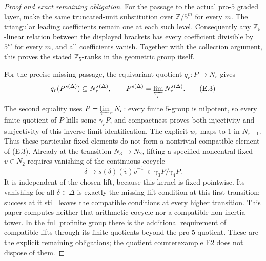 \begin{proof}[Proof and exact remaining obligation]
For the passage to the actual pro-$5$ graded layer, make the same
truncated-unit substitution over $\mathbb Z/5^m$ for every $m$.
The triangular leading coefficients remain one at each such level.
Consequently any $\mathbb Z_5$-linear relation between the displayed
brackets has every coefficient divisible by $5^m$ for every $m$, and
all coefficients vanish. Together with the collection argument, this
proves the stated $\mathbb Z_5$-ranks in the geometric group itself.

For the precise missing passage, the equivariant quotient $q_r:P\to N_r$ gives
\[
 q_r(P^{s(\Delta)})\subseteq N_r^{s(\Delta)},\qquad
 P^{s(\Delta)}=\varprojlim_r N_r^{s(\Delta)}.
 \tag{E.3}
\]
The second equality uses $P=\varprojlim_rN_r$: every finite $5$-group is nilpotent, so every finite quotient of $P$ kills some $\gamma_rP$, and compactness proves both injectivity and surjectivity of this inverse-limit identification. The explicit $w_r$ maps to $1$ in $N_{r-1}$. Thus these particular fixed elements do not form a nontrivial compatible element of (E.3). Already at the transition $N_3\to N_2$, lifting a specified noncentral fixed $v\in N_2$ requires vanishing of the continuous cocycle
\[
 \delta\longmapsto s(\delta)(\widetilde v)\widetilde v^{-1}
 \ \in\gamma_3P/\gamma_4P.
\]
It is independent of the chosen lift, because this kernel is fixed pointwise. Its vanishing for all $\delta\in\Delta$ is exactly the missing lift condition at this first transition; success at it still leaves the compatible conditions at every higher transition. This paper computes neither that arithmetic cocycle nor a compatible non-inertia tower. In the full profinite group there is the additional requirement of compatible lifts through its finite quotients beyond the pro-$5$ quotient. These are the explicit remaining obligations; the quotient counterexample E2 does not dispose of them.
\end{proof}
